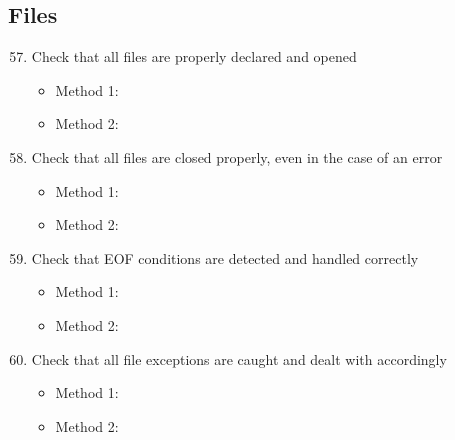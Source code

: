 \subsection{Files}
\begin{enumerate}
	\setcounter{enumi}{56}
	\item Check that all files are properly declared and opened
	\begin{itemize}
		\item Method 1: \cmark
		\item Method 2:
	\end{itemize}
	\item Check that all files are closed properly, even in the case of an error
	\begin{itemize}
		\item Method 1: \cmark
		\item Method 2:
	\end{itemize}
	\item Check that EOF conditions are detected and handled correctly
	\begin{itemize}
		\item Method 1: \cmark
		\item Method 2:
	\end{itemize}
	\item Check that all file exceptions are caught and dealt with accordingly
	\begin{itemize}
		\item Method 1: \cmark
		\item Method 2:
	\end{itemize}
\end{enumerate}